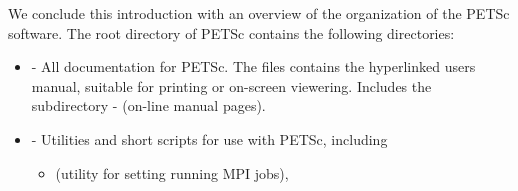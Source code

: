 We conclude this introduction with an overview of the
organization of the PETSc software.  
The root directory of PETSc contains the following directories:

\begin{itemize}
\item {} - All documentation for PETSc. The files 
                   contains the hyperlinked users manual, suitable for printing
                   or on-screen viewering. Includes the subdirectory
 \subitem -  (on-line manual pages).
\item {} - Utilities and short scripts for use with PETSc, including
 \begin{itemize}
 \item {} (utility for setting running MPI jobs),
 \end{itemize}


\end{itemize}
